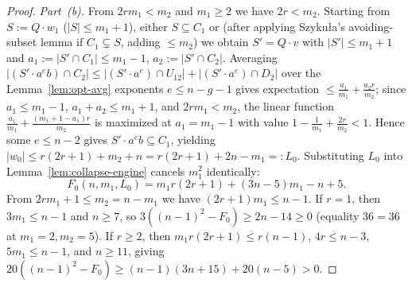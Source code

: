 \documentclass[11pt,a4paper]{article}
\theoremstyle{definition}
\theoremstyle{remark}
\begin{document}
\begin{proof}
\emph{Part~(b).} From $2r m_1 < m_2$ and $m_1 \ge 2$ we have $2r < m_2$. Starting from $S := Q \cdot w_1$ ($|S| \le m_1 + 1$), either $S \subseteq C_1$ or (after applying Szyku\l a's avoiding-subset lemma if $C_1 \subsetneq S$, adding $\le m_2$) we obtain $S' = Q \cdot v$ with $|S'| \le m_1 + 1$ and $a_1 := |S' \cap C_1| \le m_1 - 1$, $a_2 := |S' \cap C_2|$. Averaging $|(S' \cdot a^e b) \cap C_2| \le |(S' \cdot a^e) \cap U_{12}| + |(S' \cdot a^e) \cap D_2|$ over the Lemma~\ref{lem:opt-avg} exponents $e \le n - g - 1$ gives expectation $\le \frac{a_1}{m_1} + \frac{a_2 r}{m_2}$; since $a_1 \le m_1 - 1$, $a_1 + a_2 \le m_1 + 1$, and $2r m_1 < m_2$, the linear function $\frac{a_1}{m_1} + \frac{(m_1 + 1 - a_1)r}{m_2}$ is maximized at $a_1 = m_1 - 1$ with value $1 - \frac{1}{m_1} + \frac{2r}{m_2} < 1$. Hence some $e \le n - 2$ gives $S' \cdot a^e b \subseteq C_1$, yielding $|w_0| \le r(2r+1) + m_2 + n = r(2r+1) + 2n - m_1 =: L_0$. Substituting $L_0$ into Lemma~\ref{lem:collapse-engine} cancels $m_1^2$ identically:
\[
  F_0(n, m_1, L_0) = m_1 r(2r + 1) + (3n - 5)m_1 - n + 5.
\]
From $2r m_1 + 1 \le m_2 = n - m_1$ we have $(2r+1)m_1 \le n - 1$. If $r = 1$, then $3m_1 \le n - 1$ and $n \ge 7$, so $3((n-1)^2 - F_0) \ge 2n - 14 \ge 0$ (equality $36 = 36$ at $m_1 = 2, m_2 = 5$). If $r \ge 2$, then $m_1 r(2r+1) \le r(n-1)$, $4r \le n - 3$, $5m_1 \le n - 1$, and $n \ge 11$, giving $20((n-1)^2 - F_0) \ge (n-1)(3n+15) + 20(n-5) > 0$.


\end{proof}
\end{document}
